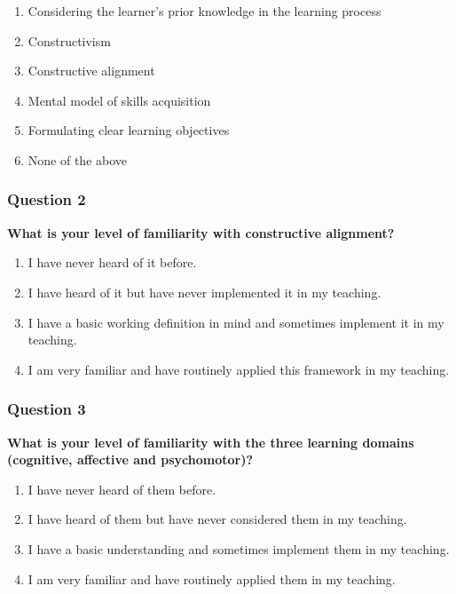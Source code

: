 \documentclass[
  letterpaper,
  DIV=11,
  numbers=noendperiod]{scrartcl}
\begin{document}
\begin{enumerate}
\def\labelenumi{\alph{enumi}.}
\item
  Considering the learner's prior knowledge in the learning process
\item
  Constructivism
\item
  Constructive alignment
\item
  Mental model of skills acquisition
\item
  Formulating clear learning objectives
\item
  None of the above
\end{enumerate}

\subsubsection{Question 2}

\textbf{What is your level of familiarity with constructive alignment?}

\begin{enumerate}
\def\labelenumi{\alph{enumi}.}
\item
  I have never heard of it before.
\item
  I have heard of it but have never implemented it in my teaching.
\item
  I have a basic working definition in mind and sometimes implement it
  in my teaching.
\item
  I am very familiar and have routinely applied this framework in my
  teaching.
\end{enumerate}

\subsubsection{Question 3}

\textbf{What is your level of familiarity with the three learning
domains (cognitive, affective and psychomotor)?}

\begin{enumerate}
\def\labelenumi{\alph{enumi}.}
\item
  I have never heard of them before.
\item
  I have heard of them but have never considered them in my teaching.
\item
  I have a basic understanding and sometimes implement them in my
  teaching.
\item
  I am very familiar and have routinely applied them in my teaching.
\end{enumerate}
\end{document}
